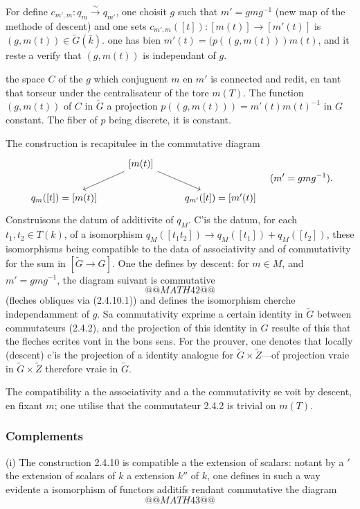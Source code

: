 \documentclass[12pt,a4paper]{article}
\theoremstyle{plain}
\theoremstyle{definition}
\theoremstyle{remark}
\begin{document}
For define $c_{m',m}: q_m \xrightarrow{\sim} q_{m'}$, one choisit $g$ such that $m' = gmg^{-1}$ (new map of the methode of descent) and one sets $c_{m',m}([t]): [m(t)] \to [m'(t)]$ is $(g, m(t)) \in \tilde{G}(\bar{k})$. one has bien $m'(t) = (p((g,m(t)))m(t)$, and it reste a verify that $(g,m(t))$ is independant of $g$.

the space $C$ of the $g$ which conjuguent $m$ en $m'$ is connected and redit, en tant that torseur under the centralisateur of the tore $m(T)$. The function $(g, m(t))$ of $C$ in $\tilde{G}$ a projection $p((g,m(t))) = m'(t)m(t)^{-1}$ in $G$ constant. The fiber of $p$ being discrete, it is constant.

The construction is recapitulee in the commutative diagram
\begin{equation}\label{eq:2.4.10.1}
\begin{tikzcd}
& {[m(t)]} \arrow[dr] \arrow[dl] \\
q_m([t]) = [m(t)] & & q_{m'}([t]) = [m'(t)]
\end{tikzcd}
\quad (m' = gmg^{-1}).
\end{equation}
Construisons the datum of additivite of $q_M$. C'is the datum, for each $t_1, t_2 \in T(k)$, of a isomorphism $q_M([t_1t_2]) \to q_M([t_1]) + q_M([t_2])$, these isomorphisms being compatible to the data of associativity and of commutativity for the sum in $[\tilde{G} \to G]$. One the defines by descent: for $m \in M$, and $m' = gmg^{-1}$, the diagram suivant is commutative
\[
@@MATH42@@
\]
(fleches obliques via (2.4.10.1)) and defines the isomorphism cherche independamment of $g$. Sa commutativity exprime a certain identity in $\tilde{G}$ between commutateurs (2.4.2), and the projection of this identity in $G$ resulte of this that the fleches ecrites vont in the bons sens. For the prouver, one denotes that locally (descent) c'is the projection of a identity analogue for $\tilde{G} \times \tilde{Z}$---of projection vraie in $\tilde{G} \times \tilde{Z}$ therefore vraie in $\tilde{G}$.

The compatibility a the associativity and a the commutativity se voit by descent, en fixant $m$; one utilise that the commutateur 2.4.2 is trivial on $m(T)$.

\subsubsection{Complements}

(i) The construction 2.4.10 is compatible a the extension of scalars: notant by a $'$ the extension of scalars of $k$ a extension $k''$ of $k$, one defines in such a way evidente a isomorphism of functors additifs rendant commutative the diagram
\[
@@MATH43@@
\]
\end{document}
